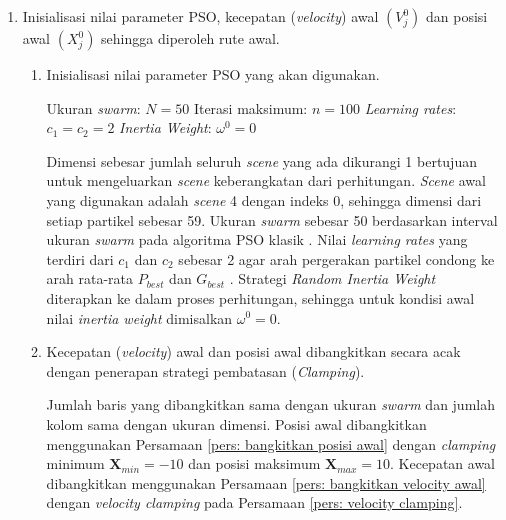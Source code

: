 {{    \begin{enumerate}[align = left, left = 0cm, nolistsep]
        \item Inisialisasi nilai parameter PSO, kecepatan (\textit{velocity}) awal $(V_{j}^{0})$ dan posisi awal $(X_{j}^{0})$ sehingga diperoleh rute awal. \par \nobreak
              \begin{enumerate}[label = (\alph*), align = left, left = 0cm, nolistsep]
                  \item Inisialisasi nilai parameter PSO yang akan digunakan. \par \nobreak
                        Ukuran \textit{swarm}: $N = 50$ \newline
                        Iterasi maksimum: $n = 100$ \newline
                        \textit{Learning rates}: $c_{1} = c_{2} = 2$ \newline
                        \textit{Inertia Weight}: $\omega^{0} = 0$

                        Dimensi sebesar jumlah seluruh \textit{scene} yang ada dikurangi 1 bertujuan untuk mengeluarkan \textit{scene} keberangkatan dari perhitungan.
                        \textit{Scene} awal yang digunakan adalah \textit{scene} 4 dengan indeks 0, sehingga dimensi dari setiap partikel sebesar 59.
                        Ukuran \textit{swarm} sebesar 50 berdasarkan interval ukuran \textit{swarm} pada algoritma PSO klasik .
                        Nilai \textit{learning rates}  yang terdiri dari $c_{1}$ dan $c_{2}$ sebesar 2 agar arah pergerakan partikel condong ke arah rata-rata $P_{best}$ dan $G_{best}$ .
                        Strategi \textit{Random Inertia Weight} diterapkan ke dalam proses perhitungan, sehingga untuk kondisi awal nilai \textit{inertia weight}
                        dimisalkan $\omega^{0} = 0$.

                  \item Kecepatan (\textit{velocity}) awal dan posisi awal dibangkitkan secara acak dengan penerapan strategi pembatasan (\textit{Clamping}). \par \nobreak
                        Jumlah baris yang dibangkitkan sama dengan ukuran \textit{swarm} dan jumlah kolom sama dengan ukuran dimensi.
                        Posisi awal dibangkitkan menggunakan Persamaan \ref{pers: bangkitkan posisi awal} dengan \textit{clamping} minimum $\boldsymbol{X}_{min} = -10$ dan posisi maksimum $\boldsymbol{X}_{max} = 10$.
                        Kecepatan awal dibangkitkan menggunakan Persamaan \ref{pers: bangkitkan velocity awal} dengan \textit{velocity clamping} pada Persamaan \ref{pers: velocity clamping}.


\end{enumerate}
\end{enumerate}}}
